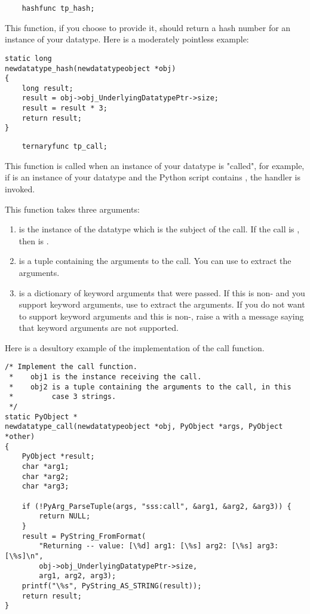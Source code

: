 \begin{verbatim}
    hashfunc tp_hash;
\end{verbatim}

This function, if you choose to provide it, should return a hash
number for an instance of your datatype. Here is a moderately
pointless example:

\begin{verbatim}
static long
newdatatype_hash(newdatatypeobject *obj)
{
    long result;
    result = obj->obj_UnderlyingDatatypePtr->size;
    result = result * 3;
    return result;
}
\end{verbatim}

\begin{verbatim}
    ternaryfunc tp_call;
\end{verbatim}

This function is called when an instance of your datatype is "called",
for example, if  is an instance of your datatype and the Python
script contains , the  handler is
invoked.

This function takes three arguments:

\begin{enumerate}
  \item
     is the instance of the datatype which is the subject of
    the call. If the call is , then  is
    .

  \item
     is a tuple containing the arguments to the call.  You
    can use  to extract the arguments.

  \item
     is a dictionary of keyword arguments that were passed.
    If this is non-\NULL{} and you support keyword arguments, use
     to extract the
    arguments.  If you do not want to support keyword arguments and
    this is non-\NULL, raise a  with a message
    saying that keyword arguments are not supported.
\end{enumerate}
       
Here is a desultory example of the implementation of the call function.

\begin{verbatim}
/* Implement the call function.
 *    obj1 is the instance receiving the call.
 *    obj2 is a tuple containing the arguments to the call, in this
 *         case 3 strings.
 */
static PyObject *
newdatatype_call(newdatatypeobject *obj, PyObject *args, PyObject *other)
{
    PyObject *result;
    char *arg1;
    char *arg2;
    char *arg3;

    if (!PyArg_ParseTuple(args, "sss:call", &arg1, &arg2, &arg3)) {
        return NULL;
    }
    result = PyString_FromFormat(
        "Returning -- value: [\%d] arg1: [\%s] arg2: [\%s] arg3: [\%s]\n",
        obj->obj_UnderlyingDatatypePtr->size,
        arg1, arg2, arg3);
    printf("\%s", PyString_AS_STRING(result));
    return result;
}
\end{verbatim}

